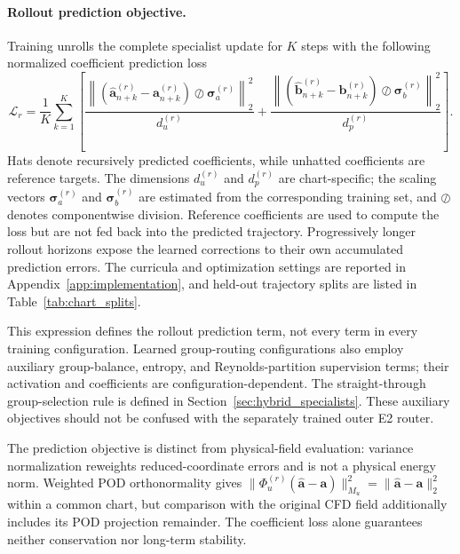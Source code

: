 \paragraph{Rollout prediction objective.}
Training unrolls the complete specialist update for $K$ steps with the following normalized coefficient prediction loss
\begin{equation}
  \mathcal L_r=\frac{1}{K}\sum_{k=1}^{K}\left[
  \frac{\left\|(\widehat{\bm a}_{n+k}^{(r)}-\bm a_{n+k}^{(r)})
  \oslash\bm\sigma_a^{(r)}\right\|_2^2}{d_u^{(r)}}
  +\frac{\left\|(\widehat{\bm b}_{n+k}^{(r)}-\bm b_{n+k}^{(r)})
  \oslash\bm\sigma_b^{(r)}\right\|_2^2}{d_p^{(r)}}\right].
  \label{eq:main_rollout_loss}
\end{equation}
Hats denote recursively predicted coefficients, while unhatted
coefficients are reference targets. The dimensions $d_u^{(r)}$ and
$d_p^{(r)}$ are chart-specific; the scaling vectors
$\bm\sigma_a^{(r)}$ and $\bm\sigma_b^{(r)}$ are estimated from the
corresponding training set, and $\oslash$ denotes componentwise
division. Reference coefficients are used to compute the loss but
are not fed back into the predicted trajectory. Progressively longer
rollout horizons expose the learned corrections to their own
accumulated prediction errors. The curricula and optimization
settings are reported in Appendix~\ref{app:implementation}, and
held-out trajectory splits are listed in Table~\ref{tab:chart_splits}.

This expression defines the rollout prediction term, not every term
in every training configuration. Learned group-routing configurations
also employ auxiliary group-balance, entropy, and Reynolds-partition
supervision terms; their activation and coefficients are
configuration-dependent. The straight-through group-selection rule
is defined in Section~\ref{sec:hybrid_specialists}.
These auxiliary objectives should not be confused with the separately
trained outer E2 router.

The prediction objective is distinct from physical-field evaluation:
variance normalization reweights reduced-coordinate errors and is
not a physical energy norm. Weighted POD orthonormality gives
$\|\Phi_u^{(r)}(\widehat{\bm a}-\bm a)\|_{M_u}^2
=\|\widehat{\bm a}-\bm a\|_2^2$ within a common chart, but comparison
with the original CFD field additionally includes its POD projection
remainder. The coefficient loss alone guarantees neither
conservation nor long-term stability.
